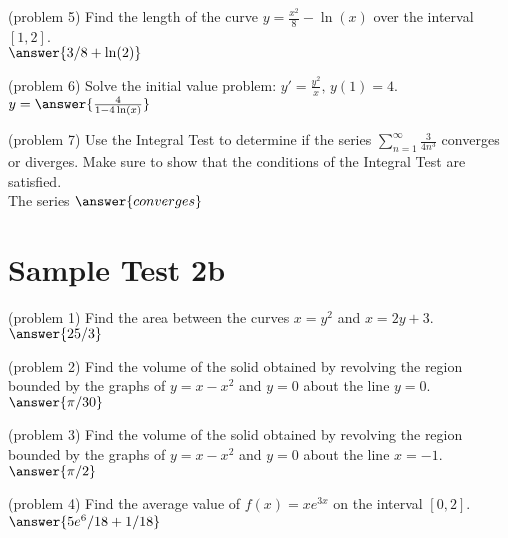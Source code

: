 \documentclass[handout]{ximera}
\begin{document}
\begin{problem}(problem 5)
Find the length of the curve $\displaystyle y = \frac{x^2}{8} - \ln(x)$ over the interval $[1, 2]$.\\
$\answer{3/8 + \ln(2)}$
\end{problem}


\begin{problem}(problem 6)
Solve the initial value problem: $\displaystyle y' = \frac{y^2}{x},\, y(1) = 4$.\\
$y = \answer{\frac{4}{1- 4\ln(x)}}$
\end{problem}


\begin{problem}(problem 7)
Use the Integral Test to determine if the series $\displaystyle \sum_{n=1}^\infty \frac{3}{4n^3}$
converges or diverges. Make sure to show that the
conditions of the Integral Test are satisfied.\\
The series $\answer{converges}$
\end{problem}

\section{Sample Test 2b}

\begin{problem}(problem 1)
Find the area between the curves $x = y^2$ and $x = 2y + 3$.\\
$\answer{25/3}$
\end{problem}


\begin{problem}(problem 2)
Find the volume of the solid obtained by revolving the region bounded by the 
graphs of $y = x-x^2$ and $y = 0$ about the line $ y = 0$.\\
$\answer{\pi/30}$
\end{problem}


\begin{problem}(problem 3)
Find the volume of the solid obtained by revolving the region bounded by the 
graphs of $y = x-x^2$ and $y = 0$ about the line $x = -1$.\\
$\answer{\pi/2}$
\end{problem}


\begin{problem}(problem 4)
Find the average value of $f(x) = xe^{3x}$ on the interval $[0, 2]$.\\
$\answer{5e^6/18  + 1/18}$
\end{problem}
\end{document}
